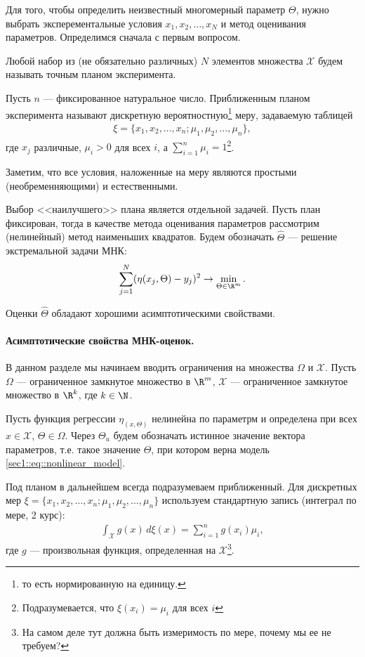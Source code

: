 Для того, чтобы определить неизвестный многомерный параметр $\Theta$, нужно выбрать эксперементальные условия $x_1, x_2, \ldots, x_N$ и метод
оценивания параметров. Определимся сначала с первым вопросом.
\begin{dfn}
    Любой набор из (не обязательно различных) $N$ элементов множества $\mathcal X$ будем называть точным планом эксперимента.
\end{dfn}
\begin{dfn}
    Пусть $n$ --- фиксированное натуральное число.
    Приближенным планом эксперимента называют дискретную вероятностную\footnote{то есть нормированную на единицу.} меру, задаваемую таблицей
    \begin{gather}
        \xi = \{x_1, x_2, \ldots, x_n; \mu_1, \mu_2, \ldots, \mu_n\},
    \end{gather}
    где $x_j$ различные, $\mu_i > 0$ для всех $i$, а $\sum_{i=1}^n \mu_i = 1$\footnote{Подразумевается, что $\xi(x_i) = \mu_i$ для всех $i$}.
\end{dfn}
Заметим, что все условия, наложенные на меру являются простыми (необременняющими) и естественными.

Выбор <<наилучшего>> плана является отдельной задачей. Пусть план фиксирован, тогда в качестве метода оценивания параметров рассмотрим (нелинейный)
метод наименьших квадратов.
Будем обозначать $\hat \Theta$ --- решение экстремальной задачи МНК:
\begin{gather*}
    \sum_{j = 1}^N (\eta(x_j, \Theta) - y_j)^2 \to \min_{\Theta \in \R^m}.
\end{gather*}

Оценки $\hat \Theta$ обладают хорошими асимптотическими свойствами.

\paragraph{Асимптотические свойства МНК-оценок.}
В данном разделе мы начинаем вводить ограничения на множества $\Omega$ и $\mathcal X$.
Пусть $\Omega$ --- ограниченное замкнутое множество в $\R^m$, $\mathcal X$ --- ограниченное замкнутое множество в $\R^k$,
где $k \in \N$.

Пусть функция регрессии $\eta_(x, \Theta)$ нелинейна по параметрм и определена при всех $x \in \mathcal X$, $\Theta \in \Omega$.
Через $\Theta_u$ будем обозначать истинное значение вектора параметров, т.е. такое значение $\Theta$, при котором верна модель
\eqref{sec1::eq::nonlinear_model}.

Под планом в дальнейшем всегда подразумеваем приближенный. Для дискретных мер $\xi = \{x_1, x_2, \ldots, x_n; \mu_1, \mu_2, \ldots, \mu_n\}$
используем стандартную запись (интеграл по мере, 2 курс):
\begin{gather*}
\int_\mathcal X g(x)\, d\xi(x) = \sum_{i = 1}^n g(x_i) \mu_i,
\end{gather*}
где $g$ --- произвольная функция, определенная на $\mathcal X$\footnote{На самом деле тут должна быть измеримость по мере, почему мы ее не требуем?}.

